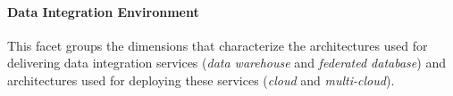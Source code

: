 \paragraph{Data Integration Environment}  
This facet groups the dimensions that characterize the architectures used for delivering data integration services ({\em data warehouse} and  {\em federated database}) and  architectures used for deploying these services ({\em cloud} and {\em multi-cloud}).


